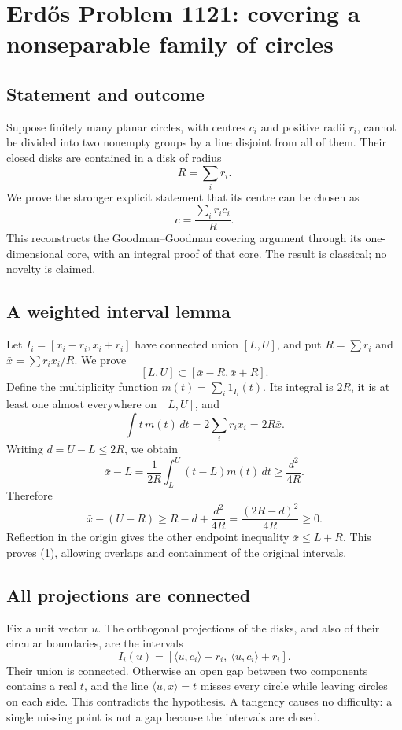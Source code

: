 \section*{Erd\H{o}s Problem 1121: covering a nonseparable family of circles}
\subsection*{Statement and outcome}
Suppose finitely many planar circles, with centres $c_i$ and positive radii $r_i$, cannot be divided into two nonempty groups by a line disjoint from all of them. Their closed disks are contained in a disk of radius
\[
 R=\sum_i r_i.
\]
We prove the stronger explicit statement that its centre can be chosen as
\[
 c=\frac{\sum_i r_i c_i}{R}.
\]
This reconstructs the Goodman--Goodman covering argument through its one-dimensional core, with an integral proof of that core. The result is classical; no novelty is claimed.

\subsection*{A weighted interval lemma}
Let $I_i=[x_i-r_i,x_i+r_i]$ have connected union $[L,U]$, and put $R=\sum r_i$ and $\bar x=\sum r_i x_i/R$. We prove
\[
 [L,U]\subset[\bar x-R,\bar x+R].
 \tag{1}
\]
Define the multiplicity function $m(t)=\sum_i1_{I_i}(t)$. Its integral is $2R$, it is at least one almost everywhere on $[L,U]$, and
\[
 \int t\,m(t)\,dt=2\sum_i r_i x_i=2R\bar x.
\]
Writing $d=U-L\le2R$, we obtain
\[
 \bar x-L
 =\frac1{2R}\int_L^U(t-L)m(t)\,dt
 \ge\frac{d^2}{4R}.
\]
Therefore
\[
 \bar x-(U-R)\ge R-d+\frac{d^2}{4R}
 =\frac{(2R-d)^2}{4R}\ge0.
\]
Reflection in the origin gives the other endpoint inequality $\bar x\le L+R$. This proves (1), allowing overlaps and containment of the original intervals.

\subsection*{All projections are connected}
Fix a unit vector $u$. The orthogonal projections of the disks, and also of their circular boundaries, are the intervals
\[
 I_i(u)=[\langle u,c_i\rangle-r_i,\ \langle u,c_i\rangle+r_i].
\]
Their union is connected. Otherwise an open gap between two components contains a real $t$, and the line $\langle u,x\rangle=t$ misses every circle while leaving circles on each side. This contradicts the hypothesis. A tangency causes no difficulty: a single missing point is not a gap because the intervals are closed.

